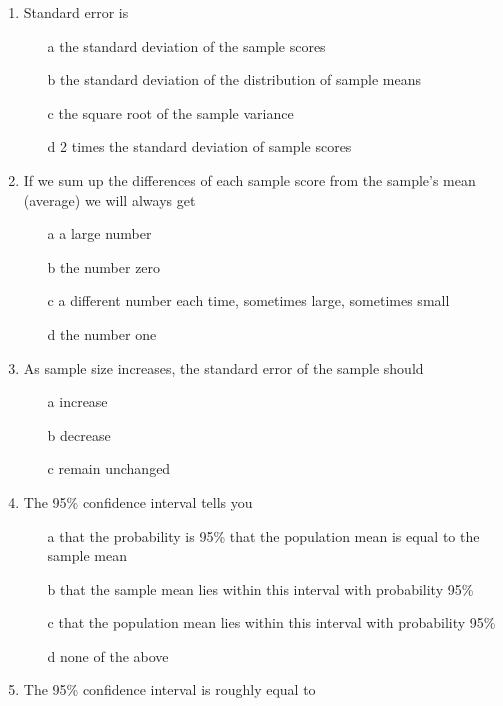 \documentclass[12pt]{book}\usepackage[]{graphicx}\usepackage[]{color}
\begin{document}
\begin{enumerate}
\item Standard error is

\begin{enumerate}
\item[a] the standard deviation of the sample scores
\item[b] the standard deviation of the distribution of sample means
\item[c] the square root of the sample variance
\item[d] 2 times the standard deviation of sample scores
\end{enumerate}

\item
If we sum up the differences of each sample score from the sample's mean (average) we will always get

\begin{enumerate}
\item[a] a large number
\item[b] the number zero
\item[c] a different number each time, sometimes large, sometimes small
\item[d] the number one
\end{enumerate}

\item As sample size increases, the standard error of the sample should

\begin{enumerate}
\item[a]
increase
\item[b]
decrease
\item[c]
remain unchanged
\end{enumerate}

\item
The 95\% confidence interval tells you

\begin{enumerate}
\item[a]
that the probability is 95\% that the population mean is equal to the sample mean
\item[b]
that the sample mean lies within this interval with probability 95\%
\item[c]
that the population mean lies within this interval with probability 95\%
\item[d] 
none of the above
\end{enumerate}

\item
The 95\% confidence interval is roughly equal to 


\end{enumerate}
\end{document}
